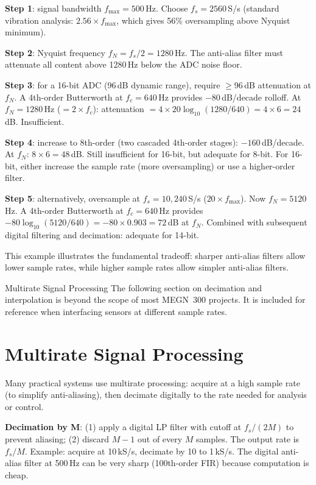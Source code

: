 \documentclass[11pt,letterpaper,twoside,openany]{book}
\begin{document}
\textbf{Step 1}: signal bandwidth $f_{\max} = 500$\,Hz. Choose $f_s = 2560$\,S/s (standard vibration analysis: $2.56 \times f_{\max}$, which gives 56\% oversampling above Nyquist minimum).

\textbf{Step 2}: Nyquist frequency $f_N = f_s/2 = 1280$\,Hz. The anti-alias filter must attenuate all content above 1280\,Hz below the ADC noise floor.

\textbf{Step 3}: for a 16-bit ADC (96\,dB dynamic range), require $\geq$96\,dB attenuation at $f_N$. A 4th-order Butterworth at $f_c = 640$\,Hz provides $-80$\,dB/decade rolloff. At $f_N = 1280$\,Hz ($= 2 \times f_c$): attenuation $= 4 \times 20\log_{10}(1280/640) = 4 \times 6 = 24$\,dB. Insufficient.

\textbf{Step 4}: increase to 8th-order (two cascaded 4th-order stages): $-160$\,dB/decade. At $f_N$: $8 \times 6 = 48$\,dB. Still insufficient for 16-bit, but adequate for 8-bit. For 16-bit, either increase the sample rate (more oversampling) or use a higher-order filter.

\textbf{Step 5}: alternatively, oversample at $f_s = 10{,}240$\,S/s ($20\times f_{\max}$). Now $f_N = 5120$\,Hz. A 4th-order Butterworth at $f_c = 640$\,Hz provides $-80\log_{10}(5120/640) = -80 \times 0.903 = 72$\,dB at $f_N$. Combined with subsequent digital filtering and decimation: adequate for 14-bit.

This example illustrates the fundamental tradeoff: sharper anti-alias filters allow lower sample rates, while higher sample rates allow simpler anti-alias filters.

\begin{advancedbox}{Multirate Signal Processing}
The following section on decimation and interpolation is beyond the scope of most MEGN~300 projects. It is included for reference when interfacing sensors at different sample rates.
\end{advancedbox}
\section{Multirate Signal Processing}
Many practical systems use multirate processing: acquire at a high sample rate (to simplify anti-aliasing), then decimate digitally to the rate needed for analysis or control.

\textbf{Decimation by M}: (1) apply a digital LP filter with cutoff at $f_s/(2M)$ to prevent aliasing; (2) discard $M-1$ out of every $M$ samples. The output rate is $f_s/M$. Example: acquire at 10\,kS/s, decimate by 10 to 1\,kS/s. The digital anti-alias filter at 500\,Hz can be very sharp (100th-order FIR) because computation is cheap.
\end{document}
